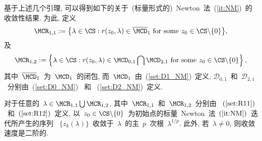 
基于上述几个引理,
可以得到如下的关于~(标量形式的)~Newton~法~(\ref{it:NM})~的收敛性结果.
为此, 定义
\begin{equation}
\label{set:R11} \MCR_{1,1} := \big\{\lambda \in \CS: r(z_0,\lambda)
\in \overline{\MCD}_1 \text{ for some } z_0 \in
\CS\backslash\{0\}\big\},
\end{equation}
及
\begin{equation}
\label{set:R12} \MCR_{1,2} := \left\{\lambda \in \CS: r(z_0,\lambda)
\in \MCD_{0,1} \bigcap \MCD_{2,1} \text{ for some } z_0 \in
\CS\backslash\{0\}\right\},
\end{equation}
其中~$\overline{\MCD}_1$~为~$\MCD_1$~的闭包,
而~$\MCD_1$~由~(\ref{set:D1_NM})~定义, $\mathcal
{D}_{0,1}$~和~$\mathcal {D}_{2,1}$~分别由~(\ref{set:D0_NM})~ 和
~(\ref{set:D2_NM})~定义.


\begin{lemma}
\label{lem:ScalarNMCon1} %
对于任意的~$\lambda \in \MCR_{1,1} \bigcup \MCR_{1,2}$,
其中~$\MCR_{1,1}$~和~$\MCR_{1,2}$~分别由
~$(\ref{set:R11})$~和~$(\ref{set:R12})$~定义, 以~$z_0 \in
\CS\backslash\{0\}$~为初始点的标量~Newton~法~$(\ref{it:NM})$~迭代所产生的序列
~$\{z_k(\lambda)\}$~收敛于~$\lambda$~的主~$p$~次根~$\lambda^{1/p}$.
此外, 若~$\lambda \neq 0$, 则收敛速度是二阶的.
\end{lemma}


